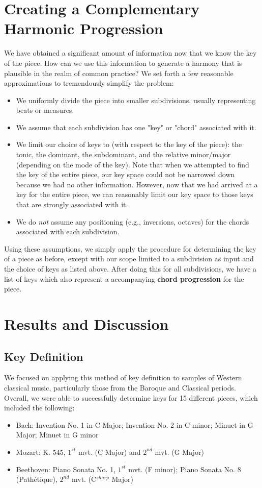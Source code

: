 \documentclass[11pt]{article}
\begin{document}
\section{Creating a Complementary Harmonic Progression}
We have obtained a significant amount of information now that we know the key of the piece. How can we use this information to generate a harmony that is plausible in the realm of common practice? We set forth a few reasonable approximations to tremendously simplify the problem:

\begin{itemize}
\item We uniformly divide the piece into smaller subdivisions, usually representing beats or measures.
\item We assume that each subdivision has one "key" or "chord" associated with it.
\item We limit our choice of keys to (with respect to the key of the piece): the tonic, the dominant, the subdominant, and the relative minor/major (depending on the mode of the key). Note that when we attempted to find the key of the entire piece, our key space could not be narrowed down because we had no other information. However, now that we had arrived at a key for the entire piece, we can reasonably limit our key space to those keys that are strongly associated with it.
\item We do {\it not} assume any positioning (e.g., inversions, octaves) for the chords associated with each subdivision.
\end{itemize}

Using these assumptions, we simply apply the procedure for determining the key of a piece as before, except with our scope limited to a subdivision as input and the choice of keys as listed above. After doing this for all subdivisions, we have a list of keys which also represent a accompanying {\bf chord progression} for the piece.

\section{Results and Discussion}

\subsection{Key Definition}
We focused on applying this method of key definition to samples of Western classical music, particularly those from the Baroque and Classical periods. Overall, we were able to successfully determine keys for 15 different pieces, which included the following:
\begin{itemize}
\item Bach: Invention No. 1 in C Major; Invention No. 2 in C minor; Minuet in G Major; Minuet in G minor
\item Mozart: K. 545, $1^{st}$ mvt. (C Major) and $2^{nd}$ mvt. (G Major)
\item Beethoven: Piano Sonata No. 1, $1^{st}$ mvt. (F minor); Piano Sonata No. 8 (Path\'{e}tique), $2^{nd}$ mvt. (C$^{sharp}$ Major)
\end{itemize}
\end{document}
